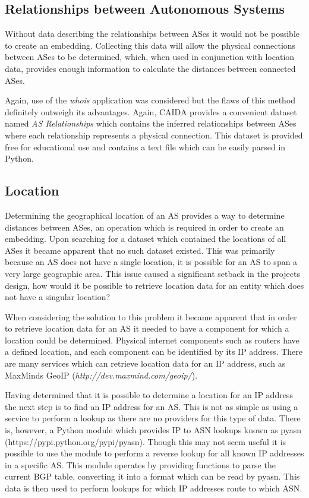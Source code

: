 \subsection{Relationships between Autonomous Systems}
Without data describing the relationships between ASes it would not be possible to create an embedding. Collecting this data will allow the physical connections between ASes to be determined, which, when used in conjunction with location data, provides enough information to calculate the distances between connected ASes.

Again, use of the \textit{whois} application was considered but the flaws of this method definitely outweigh its advantages. Again, CAIDA provides a convenient dataset named \textit{AS Relationships} which contains the inferred relationships between ASes where each relationship represents a physical connection. This dataset is provided free for educational use and contains a text file which can be easily parsed in Python. 

\subsection{Location}
Determining the geographical location of an AS provides a way to determine distances between ASes, an operation which is required in order to create an embedding. Upon searching for a dataset which contained the locations of all ASes it became apparent that no such dataset existed. This was primarily because an AS does not have a single location, it is possible for an AS to span a very large geographic area. This issue caused a significant setback in the projects design, how would it be possible to retrieve location data for an entity which does not have a singular location?

When considering the solution to this problem it became apparent that in order to retrieve location data for an AS it needed to have a component for which a location could be determined. Physical internet components such as routers have a defined location, and each component can be identified by its IP address. There are many services which can retrieve location data for an IP address, such as MaxMinds GeoIP (\textit{http://dev.maxmind.com/geoip/}). 

Having determined that it is possible to determine a location for an IP address the next step is to find an IP address for an AS. This is not as simple as using a service to perform a lookup as there are no providers for this type of data. There is, however, a Python module which provides IP to ASN lookups known as pyasn (https://pypi.python.org/pypi/pyasn). Though this may not seem useful it is possible to use the module to perform a reverse lookup for all known IP addresses in a specific AS. This module operates by providing functions to parse the current BGP table, converting it into a format which can be read by pyasn. This data is then used to perform lookups for which IP addresses route to which ASN.

